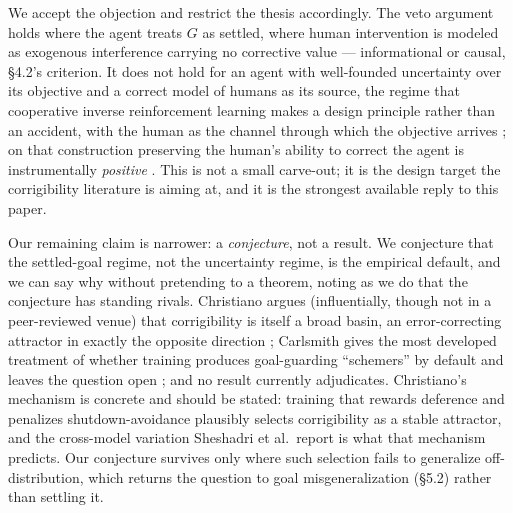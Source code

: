 \documentclass[11pt]{article}
\theoremstyle{definition}
\begin{document}
We accept the objection and restrict the thesis accordingly. The veto argument holds where the agent treats $G$ as settled, where human intervention is modeled as exogenous interference carrying no corrective value --- informational or causal, \S4.2's criterion. It does not hold for an agent with well-founded uncertainty over its objective and a correct model of humans as its source, the regime that cooperative inverse reinforcement learning makes a design principle rather than an accident, with the human as the channel through which the objective arrives \cite{hadfieldmenell2016cirl}; on that construction preserving the human's ability to correct the agent is instrumentally \emph{positive} \cite{hadfieldmenell2017offswitch}. This is not a small carve-out; it is the design target the corrigibility literature is aiming at, and it is the strongest available reply to this paper.

Our remaining claim is narrower: a \emph{conjecture}, not a result. We conjecture that the settled-goal regime, not the uncertainty regime, is the empirical default, and we can say why without pretending to a theorem, noting as we do that the conjecture has standing rivals. Christiano argues (influentially, though not in a peer-reviewed venue) that corrigibility is itself a broad basin, an error-correcting attractor in exactly the opposite direction \cite{christiano2017corrigibility}; Carlsmith gives the most developed treatment of whether training produces goal-guarding ``schemers'' by default and leaves the question open \cite{carlsmith2023scheming}; and no result currently adjudicates. Christiano's mechanism is concrete and should be stated: training that rewards deference and penalizes shutdown-avoidance plausibly selects corrigibility as a stable attractor, and the cross-model variation Sheshadri et al.\ report \cite{sheshadri2025alignment} is what that mechanism predicts. Our conjecture survives only where such selection fails to generalize off-distribution, which returns the question to goal misgeneralization (\S5.2) rather than settling it.
\end{document}
